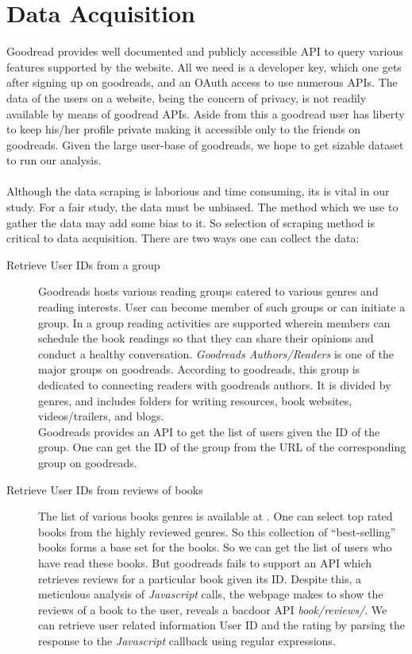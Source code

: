 \documentclass[11pt]{article}
\begin{document}
\section{Data Acquisition}
\label{sec:data_acquisition}
Goodread provides well documented and publicly accessible API to query various features supported by the website. All we need is a developer key, which one gets after signing up on goodreads, and an OAuth access to use numerous APIs. The data of the users on a website, being the concern of privacy, is not readily available by means of goodread APIs. Aside from this a goodread user has liberty to keep his/her profile private making it accessible only to the friends on goodreads. Given the large user-base of goodreads, we hope to get sizable dataset to run our analysis.\\\\
Although the data scraping is laborious and time consuming, its is vital in our study. For a fair study, the data must be unbiased. The method which we use to gather the data may add some bias to it. So selection of scraping method is critical to data acquisition. There are two ways one can collect the data:
\begin{description}
\item[Retrieve User IDs from a group]
Goodreads hosts various reading groups catered to various genres and reading interests. User can become member of such groups or can initiate a group. In a group reading activities are supported wherein members can schedule the book readings so that they can share their opinions and conduct a healthy conversation. {\it Goodreads Authors/Readers} is one of the major groups on goodreads.  According to goodreads, this group is dedicated to connecting readers with goodreads authors. It is divided by genres, and includes folders for writing resources, book websites, videos/trailers, and blogs. \\
Goodreads provides an API to get the list of users given the ID of the group. One can get the ID of the group from the URL of the corresponding group on goodreads.
\item[Retrieve User IDs from reviews of books]
The list of various books genres is available at \cite{goodreads:genres}. One can select top rated books from the highly reviewed genres. So this collection of ``best-selling'' books forms a base set for the books. So we can get the list of users who have read these books. But goodreads fails to support an API which retrieves reviews for a particular book given its ID. Despite this, a meticulous analysis of \textit{Javascript} calls, the webpage makes to show the reviews of a book to the user, reveals a bacdoor API \textit{book/reviews/}. We can retrieve user related information User ID and the rating by parsing the response to the \textit{Javascript} callback using regular expressions.
\end{description}
\end{document}
